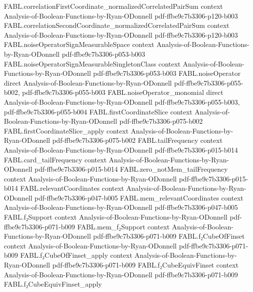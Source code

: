 \begin{theorem}
\proofstep
  {FABL.correlationFirstCoordinate_normalizedCorrelatedPairSum}
  {context}
  {Analysis-of-Boolean-Functions-by-Ryan-ODonnell}
  {pdf-ffbe9c7b3306-p120-b003}
\proofstep
  {FABL.correlationSecondCoordinate_normalizedCorrelatedPairSum}
  {context}
  {Analysis-of-Boolean-Functions-by-Ryan-ODonnell}
  {pdf-ffbe9c7b3306-p120-b003}
\proofstep
  {FABL.noiseOperatorSignMeasurableSpace}
  {context}
  {Analysis-of-Boolean-Functions-by-Ryan-ODonnell}
  {pdf-ffbe9c7b3306-p053-b003}
\proofstep
  {FABL.noiseOperatorSignMeasurableSingletonClass}
  {context}
  {Analysis-of-Boolean-Functions-by-Ryan-ODonnell}
  {pdf-ffbe9c7b3306-p053-b003}
\proofstep
  {FABL.noiseOperator}
  {direct}
  {Analysis-of-Boolean-Functions-by-Ryan-ODonnell}
  {pdf-ffbe9c7b3306-p055-b002,
    pdf-ffbe9c7b3306-p055-b003}
\proofstep
  {FABL.noiseOperator_monomial}
  {direct}
  {Analysis-of-Boolean-Functions-by-Ryan-ODonnell}
  {pdf-ffbe9c7b3306-p055-b003,
    pdf-ffbe9c7b3306-p055-b004}
\proofstep
  {FABL.firstCoordinateSlice}
  {context}
  {Analysis-of-Boolean-Functions-by-Ryan-ODonnell}
  {pdf-ffbe9c7b3306-p075-b002}
\proofstep
  {FABL.firstCoordinateSlice_apply}
  {context}
  {Analysis-of-Boolean-Functions-by-Ryan-ODonnell}
  {pdf-ffbe9c7b3306-p075-b002}
\proofstep
  {FABL.tailFrequency}
  {context}
  {Analysis-of-Boolean-Functions-by-Ryan-ODonnell}
  {pdf-ffbe9c7b3306-p015-b014}
\proofstep
  {FABL.card_tailFrequency}
  {context}
  {Analysis-of-Boolean-Functions-by-Ryan-ODonnell}
  {pdf-ffbe9c7b3306-p015-b014}
\proofstep
  {FABL.zero_notMem_tailFrequency}
  {context}
  {Analysis-of-Boolean-Functions-by-Ryan-ODonnell}
  {pdf-ffbe9c7b3306-p015-b014}
\proofstep
  {FABL.relevantCoordinates}
  {context}
  {Analysis-of-Boolean-Functions-by-Ryan-ODonnell}
  {pdf-ffbe9c7b3306-p047-b005}
\proofstep
  {FABL.mem_relevantCoordinates}
  {context}
  {Analysis-of-Boolean-Functions-by-Ryan-ODonnell}
  {pdf-ffbe9c7b3306-p047-b005}
\proofstep
  {FABL.f₂Support}
  {context}
  {Analysis-of-Boolean-Functions-by-Ryan-ODonnell}
  {pdf-ffbe9c7b3306-p071-b009}
\proofstep
  {FABL.mem_f₂Support}
  {context}
  {Analysis-of-Boolean-Functions-by-Ryan-ODonnell}
  {pdf-ffbe9c7b3306-p071-b009}
\proofstep
  {FABL.f₂CubeOfFinset}
  {context}
  {Analysis-of-Boolean-Functions-by-Ryan-ODonnell}
  {pdf-ffbe9c7b3306-p071-b009}
\proofstep
  {FABL.f₂CubeOfFinset_apply}
  {context}
  {Analysis-of-Boolean-Functions-by-Ryan-ODonnell}
  {pdf-ffbe9c7b3306-p071-b009}
\proofstep
  {FABL.f₂CubeEquivFinset}
  {context}
  {Analysis-of-Boolean-Functions-by-Ryan-ODonnell}
  {pdf-ffbe9c7b3306-p071-b009}
\proofstep
  {FABL.f₂CubeEquivFinset_apply}

\end{theorem}
